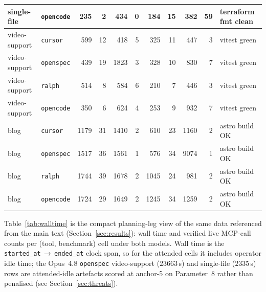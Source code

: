 \begin{table}[h]
\begin{tabular}{ll rrrr rrrr l}
single-file   & \texttt{opencode} &  235 & 2  & 434 & 0 &  184 & 15 & 382 & 59 & terraform fmt clean  \\
\midrule
video-support  & \texttt{cursor}     &  599 & 12 & 418 & 5 &  325 & 11 & 447 &  3 & vitest green         \\
video-support  & \texttt{openspec}   &  439 & 19 & 1823 & 3 & 328 & 10 & 830 &  7 & vitest green         \\
video-support  & \texttt{ralph}      &  514 &  8 & 584 & 6 &  210 &  7 & 446 &  3 & vitest green         \\
video-support  & \texttt{opencode} &  350 &  6 & 624 & 4 &  253 &  9 & 932 &  7 & vitest green         \\
\midrule
blog     & \texttt{cursor}     & 1179 & 31 & 1410 & 2 &  610 & 23 & 1160 & 2 & astro build OK       \\
blog     & \texttt{openspec}   & 1517 & 36 & 1561 & 1 &  576 & 34 & 9074 & 1 & astro build OK       \\
blog     & \texttt{ralph}      & 1744 & 39 & 1678 & 2 & 1045 & 24 &  981 & 2 & astro build OK       \\
blog     & \texttt{opencode} & 1724 & 29 & 1649 & 2 & 1245 & 34 & 1259 & 2 & astro build OK       \\
\bottomrule
\end{tabular}
\end{table}

Table~\ref{tab:walltime} is the compact planning-leg view of the same
data referenced from the main text (Section~\ref{sec:results}): wall time and
verified live MCP-call counts per (tool, benchmark) cell under both
models. Wall time is the \texttt{started\_at}\,$\to$\,\texttt{ended\_at}
clock span, so for the attended cells it includes operator idle time;
the Opus~4.8 \texttt{openspec} video-support ($23663$\,s) and
single-file ($2335$\,s) rows are attended-idle artefacts scored at
anchor-5 on Parameter~8 rather than penalised (see Section~\ref{sec:threats}).

